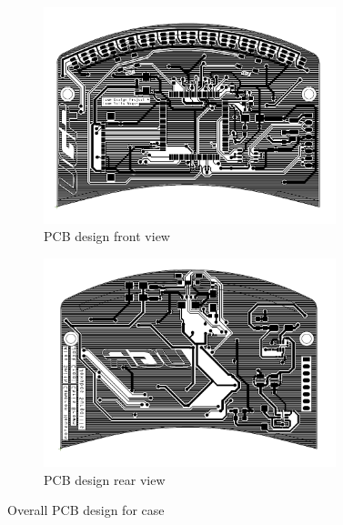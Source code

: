 \begin{figure}[H]
\centering
\begin{subfigure}{.5\textwidth}
  \centering
  \includegraphics[width=8.5cm]{Figures/PCB_front.png}
  \caption{PCB design front view}
  \label{fig:PCB_front}
\end{subfigure}%
\begin{subfigure}{.5\textwidth}
  \centering
  \includegraphics[width=8.5cm]{Figures/PCB_back.png}
  \caption{PCB design rear view}
  \label{fig:PCB_back}
\end{subfigure}
\caption{Overall PCB design for case}
\label{fig:PCB}
\end{figure}